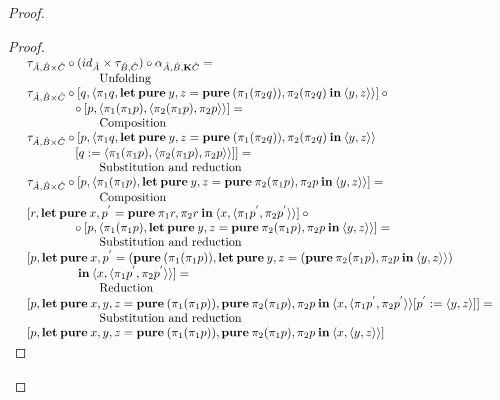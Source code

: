 \documentclass[a4paper]{article}
\begin{document}
\begin{proof}
\begin{proof}
$\begin{array}{lll}
&\tau_{\hat{A}, \hat{B} \times \hat{C}} \circ (id_{\hat{A}} \times \tau_{\hat{B}, \hat{C}}) \circ \alpha_{\hat{A}, \hat{B}, {\bf K}\hat{C}} = & \\
&\quad\quad\quad\quad\quad\quad \text{Unfolding}& \\
&\tau_{\hat{A}, \hat{B} \times \hat{C}} \circ [q, \langle \pi_1 q, {\bf let \: pure \:} y, z = {\bf pure \:} (\pi_1 (\pi_2 q)), \pi_2 (\pi_2 q) {\: \bf in \:} \langle y, z \rangle \rangle] \: \circ & \\
&\quad\quad\quad\quad \circ \: [p, \langle \pi_1 (\pi_1 p), \langle \pi_2 (\pi_1 p), \pi_2 p \rangle \rangle] = & \\
&\quad\quad\quad\quad\quad\quad \text{Composition}& \\
&\tau_{\hat{A}, \hat{B} \times \hat{C}} \circ [p, \langle \pi_1 q, {\bf let \: pure \:} y, z = {\bf pure \:} (\pi_1 (\pi_2 q)), \pi_2 (\pi_2 q) {\: \bf in \:} \langle y, z \rangle \rangle & \\
&\quad\quad\quad\quad [q := \langle \pi_1 (\pi_1 p), \langle \pi_2 (\pi_1 p), \pi_2 p \rangle \rangle]] = & \\
&\quad\quad\quad\quad\quad\quad \text{Substitution and reduction}& \\
&\tau_{\hat{A}, \hat{B} \times \hat{C}} \circ [p, \langle \pi_1 (\pi_1 p), {\bf let \: pure \:} y, z = {\bf pure \:} \pi_2 (\pi_1 p), \pi_2 p {\: \bf in \:} \langle y, z \rangle \rangle] = & \\
&\quad\quad\quad\quad\quad\quad \text{Composition}& \\
&[r, {\bf let \: pure \:} x, p^{'} = {\bf pure \:} \pi_1 r, \pi_2 r {\: \bf in \:} \langle x, \langle \pi_1 p^{'}, \pi_2 p^{'} \rangle\rangle] \: \circ & \\
&\quad\quad\quad\quad \circ \: [p, \langle \pi_1 (\pi_1 p), {\bf let \: pure \:} y, z = {\bf pure \:} \pi_2 (\pi_1 p), \pi_2 p {\: \bf in \:} \langle y, z \rangle \rangle] = & \\
&\quad\quad\quad\quad\quad\quad \text{Substitution and reduction}& \\
&[p, {\bf let \: pure \:} x, p^{'} = ({\bf pure \:} (\pi_1 (\pi_1 p)), {\bf let \: pure \:} y, z = ({\bf pure \:} \pi_2 (\pi_1 p), \pi_2 p {\: \bf in \:} \langle y, z \rangle \rangle) & \\
&\quad\quad\quad\quad {\: \bf in \:} \langle x, \langle \pi_1 p^{'}, \pi_2 p^{'} \rangle\rangle ] = & \\
&\quad\quad\quad\quad\quad\quad \text{Reduction}& \\
&[p, {\bf let \: pure \:} x,y,z = {\bf pure \:} (\pi_1 (\pi_1 p)), {\bf pure \:} \pi_2 (\pi_1 p), \pi_2 p {\: \bf in \:} \langle x, \langle \pi_1 p^{'}, \pi_2 p^{'} \rangle\rangle [p^{'} := \langle y, z \rangle]] = & \\
&\quad\quad\quad\quad\quad\quad \text{Substitution and reduction}& \\
&[p, {\bf let \: pure \:} x,y,z = {\bf pure \:} (\pi_1 (\pi_1 p)), {\bf pure \:} \pi_2 (\pi_1 p), \pi_2 p {\: \bf in \:} \langle x, \langle y, z \rangle\rangle]&
\end{array}$


\end{proof}
\end{proof}
\end{document}
